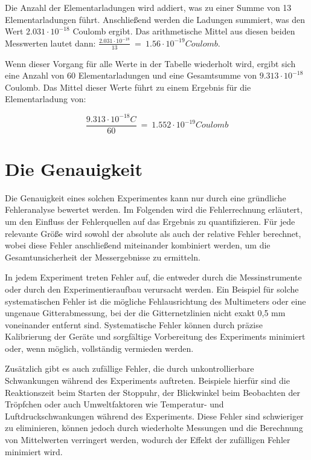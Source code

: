 \par
\noindent Die Anzahl der Elementarladungen wird addiert, was zu einer Summe von 13 Elementarladungen führt. Anschließend werden die Ladungen summiert, was den Wert $2.031 \cdot 10^{-18}$ Coulomb ergibt. Das arithmetische Mittel aus diesen beiden Messwerten lautet dann: $\frac{2.031 \cdot 10^{-18}}{13} \ = \ 1.56 \cdot 10^{-19} Coulomb$. 

Wenn dieser Vorgang für alle Werte in der Tabelle wiederholt wird, ergibt sich eine Anzahl von 60 Elementarladungen und eine Gesamtsumme von $9.313 \cdot 10^{-18}$ Coulomb. Das Mittel dieser Werte führt zu einem Ergebnis für die Elementarladung von:

\begin{equation}\label{eq:ergebnis}
	\frac{9.313 \cdot 10^{-18}C}{60} \ = \ 1.552 \cdot 10^{-19} Coulomb
\end{equation}

\section{Die Genauigkeit}\label{sec:genauigkeitAuswertung}
Die Genauigkeit eines solchen Experimentes kann nur durch eine gründliche Fehleranalyse bewertet werden. Im Folgenden wird die Fehlerrechnung erläutert, um den Einfluss der Fehlerquellen auf das Ergebnis zu quantifizieren. Für jede relevante Größe wird sowohl der absolute als auch der relative Fehler berechnet, wobei diese Fehler anschließend miteinander kombiniert werden, um die Gesamtunsicherheit der Messergebnisse zu ermitteln.

In jedem Experiment treten Fehler auf, die entweder durch die Messinstrumente oder durch den Experimentieraufbau verursacht werden. Ein Beispiel für solche systematischen Fehler ist die mögliche Fehlausrichtung des Multimeters oder eine ungenaue Gitterabmessung, bei der die Gitternetzlinien nicht exakt 0,5 mm voneinander entfernt sind. Systematische Fehler können durch präzise Kalibrierung der Geräte und sorgfältige Vorbereitung des Experiments minimiert oder, wenn möglich, vollständig vermieden werden.

Zusätzlich gibt es auch zufällige Fehler, die durch unkontrollierbare Schwankungen während des Experiments auftreten. Beispiele hierfür sind die Reaktionszeit beim Starten der Stoppuhr, der Blickwinkel beim Beobachten der Tröpfchen oder auch Umweltfaktoren wie Temperatur- und Luftdruckschwankungen während des Experiments. Diese Fehler sind schwieriger zu eliminieren, können jedoch durch wiederholte Messungen und die Berechnung von Mittelwerten verringert werden, wodurch der Effekt der zufälligen Fehler minimiert wird.

